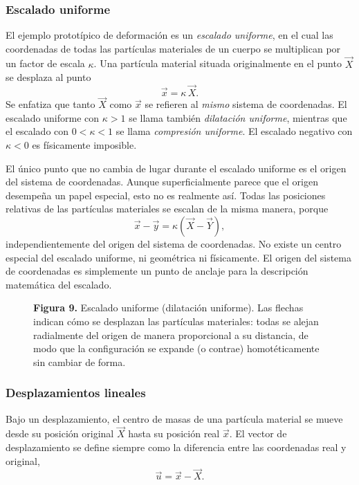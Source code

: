 \subsubsection{Escalado uniforme}

El ejemplo prototípico de deformación es un \emph{escalado uniforme}, en el cual las coordenadas de todas las partículas materiales de un cuerpo se multiplican por un factor de escala $\kappa$. Una partícula material situada originalmente en el punto $\vec{X}$ se desplaza al punto
\[ \vec{x} = \kappa\,\vec{X}. \]
Se enfatiza que tanto $\vec{X}$ como $\vec{x}$ se refieren al \emph{mismo} sistema de coordenadas. El escalado uniforme con $\kappa > 1$ se llama también \emph{dilatación uniforme}, mientras que el escalado con $0 < \kappa < 1$ se llama \emph{compresión uniforme}. El escalado negativo con $\kappa < 0$ es físicamente imposible.

El único punto que no cambia de lugar durante el escalado uniforme es el origen del sistema de coordenadas. Aunque superficialmente parece que el origen desempeña un papel especial, esto no es realmente así. Todas las posiciones relativas de las partículas materiales se escalan de la misma manera, porque
\[ \vec{x} - \vec{y} = \kappa\left(\vec{X} - \vec{Y}\right), \]
independientemente del origen del sistema de coordenadas. No existe un centro especial del escalado uniforme, ni geométrica ni físicamente. El origen del sistema de coordenadas es simplemente un punto de anclaje para la descripción matemática del escalado.

\begin{figure}[H]
\centering

\par\medskip
\textbf{Figura 9.} Escalado uniforme (dilatación uniforme). Las flechas indican cómo se desplazan las partículas materiales: todas se alejan radialmente del origen de manera proporcional a su distancia, de modo que la configuración se expande (o contrae) homotéticamente sin cambiar de forma.
\end{figure}

\subsubsection{Desplazamientos lineales}

Bajo un desplazamiento, el centro de masas de una partícula material se mueve desde su posición original $\vec{X}$ hasta su posición real $\vec{x}$. El vector de desplazamiento se define siempre como la diferencia entre las coordenadas real y original,
\[ \vec{u} = \vec{x} - \vec{X}. \]

